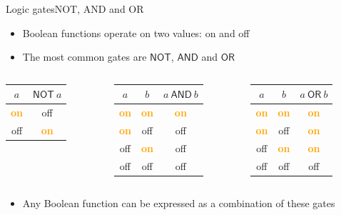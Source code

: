 \documentclass{beamer}
\newcommand{\on}[0]{\textcolor{orange}{\bf on}}
\newcommand{\off}[0]{off}
\begin{document}
\begin{frame}{Logic gates}{NOT, AND and OR}
	\begin{itemize}
		\item Boolean functions operate on two values: on and off
		\item The most common gates are $\mathsf{NOT}$, $\mathsf{AND}$ and $\mathsf{OR}$
	\end{itemize}

	\bigskip
	\begin{columns}[onlytextwidth]
		\begin{column}{0.2\textwidth}
			\centering
			\begin{tabular}{c|c}
				$a$ & $\mathsf{NOT}~ a$ \\
				\hline
				\on & \off \\
				\off & \on
			\end{tabular}
		\end{column}

		\begin{column}{0.3\textwidth}
			\centering
			\begin{tabular}{c|c|c}
				$a$ & $b$ & $a ~\mathsf{AND}~ b$ \\
				\hline
				\on & \on & \on \\
				\on & \off & \off \\
				\off & \on & \off \\
				\off & \off & \off
			\end{tabular}
		\end{column}

		\begin{column}{0.3\textwidth}
			\centering
			\begin{tabular}{c|c|c}
				$a$ & $b$ & $a ~\mathsf{OR}~ b$ \\
				\hline
				\on & \on & \on \\
				\on & \off & \on \\
				\off & \on & \on \\
				\off & \off & \off
			\end{tabular}
		\end{column}
	\end{columns}

	\pause
	\medskip
	\begin{itemize}
		\item Any Boolean function can be expressed as a combination of these gates
	\end{itemize}
\end{frame}
\end{document}
